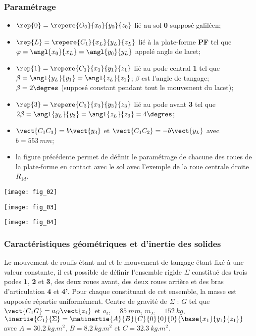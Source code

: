\subsubsection*{Paramétrage}%
\begin{itemize}
\item $\rep{0}=\repere{O_0}{x_0}{y_0}{z_0}$ lié au sol \textbf{0} supposé galiléen;
\item $\rep{L}=\repere{C_1}{x_L}{y_L}{z_L}$ lié à la plate-forme \textbf{PF} tel que $\varphi=\angl{x_0}{x_L}=\angl{y_0}{y_L}$ appelé angle de lacet;
\item $\rep{1}=\repere{C_1}{x_1}{y_1}{z_1}$ lié au pode central \textbf{1} tel que $\beta=\angl{y_L}{y_1}=\angl{z_L}{z_1}$; $\beta$ est l'angle de tangage; $\beta=2\degres$ (supposé constant pendant tout le mouvement du lacet);
\item $\rep{3}=\repere{C_3}{x_3}{y_3}{z_3}$ lié au pode avant \textbf{3} tel que $2\beta=\angl{y_L}{y_3}=\angl{z_L}{z_3}=4\degres$; 
\item $\vect{C_1C_3}=b\vect{y_3}$ et $\vect{C_1C_2}=-b\vect{y_L}$ avec $b=\SI{553}{mm}$; 
\item la figure précédente permet de définir le paramétrage de chacune des roues de la plate-forme en contact avec le sol avec l’exemple de la roue centrale droite $R_{1d}$.
\end{itemize}

\begin{marginfigure}
\centering
\texttt{[image: fig\_02]}
\end{marginfigure}


\begin{marginfigure}
\centering
\texttt{[image: fig\_03]}
\end{marginfigure}


\begin{marginfigure}
\texttt{[image: fig\_04]}
\end{marginfigure}


\subsubsection*{Caractéristiques géométriques et d’inertie des solides}
Le mouvement de roulis étant nul et le mouvement de tangage étant fixé à une valeur constante, il est possible de
définir l’ensemble rigide $\Sigma$ constitué des trois podes \textbf{1}, \textbf{2} et \textbf{3}, des deux roues avant, des deux roues arrière et des
bras d’articulation \textbf{4} et \textbf{4’}. Pour chaque constituant de cet ensemble, la masse est supposée répartie
uniformément.
Centre de gravité de $\Sigma$ : $G$ tel que $\vect{C_1G}=a_G\vect{z_1}$ et $a_G=\SI{85}{mm}$, $m_{\Sigma}=\SI{152}{kg}$, $\inertie{C_1}{\Sigma}=\matinertie{A}{B}{C}{0}{0}{0}{\base{x_1}{y_1}{z_1}}$ 	avec $A=\SI{30,2}{kg.m^2}$, $B=\SI{8,2}{kg.m^2}$ et $C=\SI{32,3}{kg.m^2}$.


